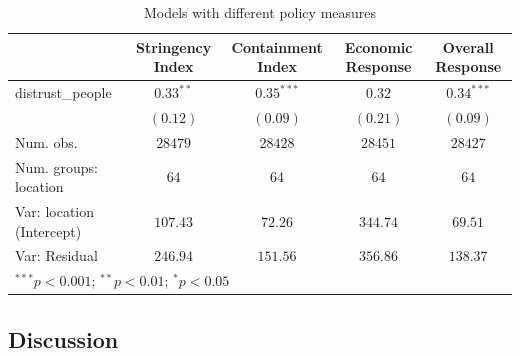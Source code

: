 \documentclass[
  11pt,
]{article}
\begin{document}
\begin{table}
\caption{Models with different policy measures}
\begin{center}
\begin{tabular}{l c c c c}
\hline
 & Stringency Index & Containment Index & Economic Response & Overall Response \\
\hline
distrust\_people          & $0.33^{**}$ & $0.35^{***}$ & $0.32$   & $0.34^{***}$ \\
                          & $(0.12)$    & $(0.09)$     & $(0.21)$ & $(0.09)$     \\
\hline
Num. obs.                 & $28479$     & $28428$      & $28451$  & $28427$      \\
Num. groups: location     & $64$        & $64$         & $64$     & $64$         \\
Var: location (Intercept) & $107.43$    & $72.26$      & $344.74$ & $69.51$      \\
Var: Residual             & $246.94$    & $151.56$     & $356.86$ & $138.37$     \\
\hline
\multicolumn{5}{l}{\scriptsize{$^{***}p<0.001$; $^{**}p<0.01$; $^{*}p<0.05$}}
\end{tabular}
\label{tab:policy}
\end{center}
\end{table}

\hypertarget{discussion}{%
\subsection{Discussion}\label{discussion}}
\end{document}
